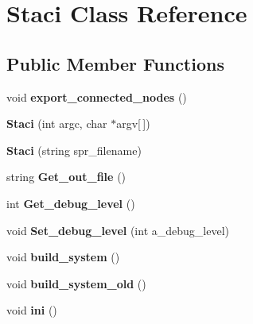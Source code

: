 \hypertarget{class_staci}{}\section{Staci Class Reference}
\label{class_staci}
\subsection*{Public Member Functions}
\begin{DoxyCompactItemize}
\item 
\mbox{\label{class_staci_ac0b3fc6ab6ed135b47b004e0053b51a1}} 
void {\bfseries export\+\_\+connected\+\_\+nodes} ()
\item 
\mbox{\label{class_staci_a6f7ee7b08cba6b9a84a2472610fc9b30}} 
{\bfseries Staci} (int argc, char $\ast$argv\mbox{[}$\,$\mbox{]})
\item 
\mbox{\label{class_staci_ae470e416c7900fe47a198deb48faa173}} 
{\bfseries Staci} (string spr\+\_\+filename)
\item 
\mbox{\label{class_staci_a3b63425864b8bbc369a64e61803fe5fe}} 
string {\bfseries Get\+\_\+out\+\_\+file} ()
\item 
\mbox{\label{class_staci_a60eb2cc5e192ece5607684d13252ea42}} 
int {\bfseries Get\+\_\+debug\+\_\+level} ()
\item 
\mbox{\label{class_staci_aae5279dcb5e5ac4543aa1bcf0b104da1}} 
void {\bfseries Set\+\_\+debug\+\_\+level} (int a\+\_\+debug\+\_\+level)
\item 
\mbox{\label{class_staci_a0153c20898e554922b15cee551a9f982}} 
void {\bfseries build\+\_\+system} ()
\item 
\mbox{\label{class_staci_ac8690e5b15e90589d09bf72b07d24e5e}} 
void {\bfseries build\+\_\+system\+\_\+old} ()
\item 
\mbox{\label{class_staci_ad884bf7a487813b79d2a171cbfd0537a}} 
void {\bfseries ini} ()
\item 
\mbox{\label{class_staci_ad52e09f1b75b48551ce5fbc8aad042cc}} 

\end{DoxyCompactItemize}
